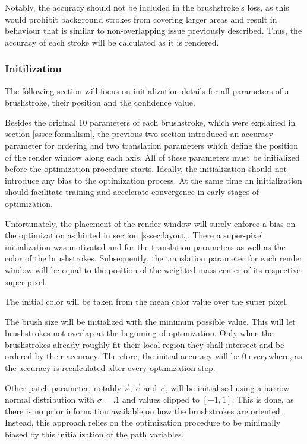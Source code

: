 Notably, the accuracy should not be included in the brushstroke's loss, as this would prohibit background strokes from covering larger areas and result in behaviour that is similar to non-overlapping issue previously described.
Thus, the accuracy of each stroke will be calculated as it is rendered.


\subsubsection{Initilization}

The following section will focus on initialization details for all parameters of a brushstroke, their position and the confidence value.

Besides the original 10 parameters of each brushstroke, which were explained in section \ref{sssec:formalism}, the previous two section introduced an accuracy parameter for ordering and two translation parameters which define the position of the render window along each axis.
All of these parameters must be initialized before the optimization procedure starts.
Ideally, the initialization should not introduce any bias to the optimization process.
At the same time an initialization should facilitate training and accelerate convergence in early stages of optimization.

Unfortunately, the placement of the render window will surely enforce a bias on the optimization as hinted in section \ref{sssec:layout}.
There a super-pixel initialization was motivated and for the translation parameters as well as the color of the brushstrokes.
Subsequently, the translation parameter for each render window will be equal to the position of the weighted mass center of its respective super-pixel.

The initial color will be taken from the mean color value over the super pixel.

The brush size will be initialized with the minimum possible value.
This will let brushstrokes not overlap at the beginning of optimization.
Only when the brushstrokes already roughly fit their local region they shall intersect and be ordered by their accuracy.
Therefore, the initial accuracy will be 0 everywhere, as the accuracy is recalculated after every optimization step.

Other patch parameter, notably $\vec{s}$, $\vec{e}$ and $\vec{c}$, will be initialised using a narrow normal distribution with $\sigma = .1$ and values clipped to $[-1, 1]$.
This is done, as there is no prior information available on how the brushstrokes are oriented.
Instead, this approach relies on the optimization procedure to be minimally biased by this initialization of the path variables.

